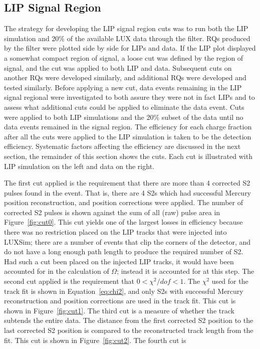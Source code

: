 \subsection{LIP Signal Region}
The strategy for developing the \ac{LIP} signal region cuts was to run both the \ac{LIP} simulation and 20\% of the available \ac{LUX} data through the filter. \ac{RQ}s produced by the filter were plotted side by side for \ac{LIP}s and data. If the \ac{LIP} plot displayed a somewhat compact region of signal, a loose cut was defined by the region of signal, and the cut was applied to both \ac{LIP} and data. Subsequent cuts on another \ac{RQ}s were developed similarly, and additional \ac{RQ}s were developed and tested similarly. Before applying a new cut, data events remaining in the \ac{LIP} signal regional were investigated to both assure they were not in fact \ac{LIP}s and to assess what additional cuts could be applied to eliminate the data event. Cuts were applied to both \ac{LIP} simulations and the 20\% subset of the data until no data events remained in the signal region. The efficiency for each charge fraction after all the cuts were applied to the \ac{LIP} simulation is taken to be the detection efficiency. Systematic factors affecting the efficiency are discussed in the next section, the remainder of this section shows the cuts. Each cut is illustrated with \ac{LIP} simulation on the left and data on the right.

The first cut applied is the requirement that there are more than 4 corrected S2 pulses found in the event. That is, there are 4 S2s which had successful Mercury position reconstruction, and position corrections were applied. The number of corrected S2 pulses is shown against the sum of all (raw) pulse area in Figure~\ref{fig:cut0}. This cut yields one of the largest losses in efficiency because there was no restriction placed on the \ac{LIP} tracks that were injected into LUXSim; there are a number of events that clip the corners of the detector, and do not have a long enough path length to produce the required number of S2. Had such a cut been placed on the injected \ac{LIP} tracks, it would have been accounted for in the calculation of $\Omega$; instead it is accounted for at this step. The second cut applied is the requirement that $0 < \chi^{2}/dof < 1$. The  $\chi^{2}$ used for the track fit is shown in Equation~\ref{eq:chi2}, and only S2s with successful Mercury reconstruction and position corrections are used in the track fit. This cut is shown in Figure~\ref{fig:cut1}. The third cut is a measure of whether the track subtends the entire data. The distance from the first corrected S2 position to the last corrected S2 position is compared to the reconstructed track length from the fit. This cut is shown in Figure~\ref{fig:cut2}. The fourth cut is 


